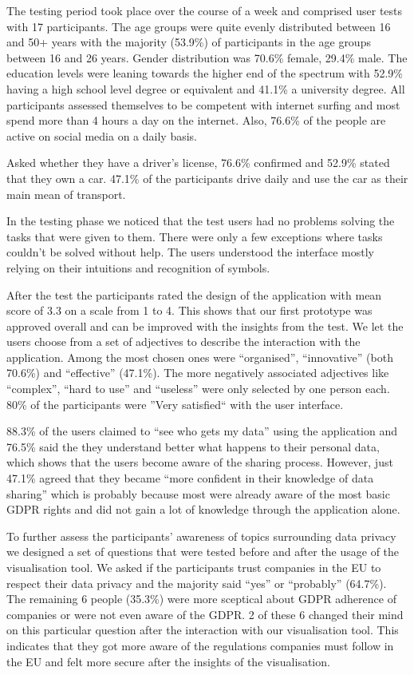 \documentclass[../paper.tex]{subfiles}
\begin{document}
  The testing period took place over the course of a week and comprised user tests with 17 participants.
  The age groups were quite evenly distributed between 16 and 50+ years with the majority (53.9\%) of participants in the age groups between 16 and 26 years.
  Gender distribution was 70.6\% female, 29.4\% male. The education levels were leaning towards the higher end of the spectrum with 52.9\% having a high school level degree or equivalent and 41.1\% a university degree.
  All participants assessed themselves to be competent with internet surfing and most spend more than 4 hours a day on the internet. Also, 76.6\% of the people are active on social media on a daily basis.
  
  Asked whether they have a driver's license, 76.6\% confirmed and 52.9\% stated that they own a car. 47.1\% of the participants drive daily and use the car as their main mean of transport.
  
  In the testing phase we noticed that the test users had no problems solving the tasks that were given to them.
  There were only a few exceptions where tasks couldn't be solved without help. The users understood the interface mostly relying on their intuitions and recognition of symbols.
  
  After the test the participants rated the design of the application with mean score of 3.3 on a scale from 1 to 4. This shows that our first prototype was approved overall and can be improved with the insights from the test. 
  We let the users choose from a set of adjectives to describe the interaction with the application. Among the most chosen ones were ``organised'', ``innovative'' (both 70.6\%) and ``effective'' (47.1\%). The more negatively associated adjectives like ``complex'', ``hard to use'' and ``useless'' were only selected by one person each.
  80\% of the participants were ''Very satisfied`` with the user interface. 
  
  
  88.3\% of the users claimed to ``see who gets my data'' using the application and 76.5\% said the they understand better what happens to their personal data, which shows that the users become aware of the sharing process.
  However, just 47.1\% agreed that they became ``more confident in their knowledge of data sharing'' which is probably because most were already aware of the most basic GDPR rights and did not gain a lot of knowledge through the application alone. 
  
  To further assess the participants' awareness of topics surrounding data privacy we designed a set of questions that were tested before and after the usage of the visualisation tool.
  We asked if the participants trust companies in the EU to respect their data privacy and the majority said ``yes'' or ``probably'' (64.7\%).
  The remaining 6 people (35.3\%) were more sceptical about GDPR adherence of companies or were not even aware of the GDPR.
  2 of these 6 changed their mind on this particular question after the interaction with our visualisation tool.
  This indicates that they got more aware of the regulations companies must follow in the EU and felt more secure after the insights of the visualisation.
  
\end{document}
